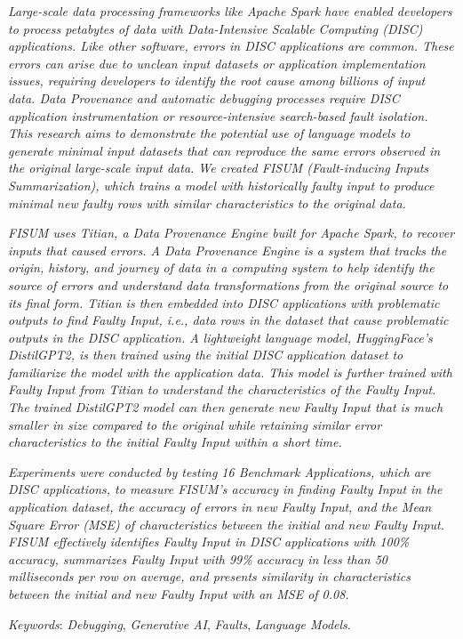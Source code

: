 \emph{Large-scale data processing frameworks like Apache Spark have enabled developers to process petabytes of data with Data-Intensive Scalable Computing (DISC) applications. Like other software, errors in DISC applications are common. These errors can arise due to unclean input datasets or application implementation issues, requiring developers to identify the root cause among billions of input data. Data Provenance and automatic debugging processes require DISC application instrumentation or resource-intensive search-based fault isolation. This research aims to demonstrate the potential use of language models to generate minimal input datasets that can reproduce the same errors observed in the original large-scale input data. We created FISUM (Fault-inducing Inputs Summarization), which trains a model with historically faulty input to produce minimal new faulty rows with similar characteristics to the original data.}

\emph{FISUM uses Titian, a Data Provenance Engine built for Apache Spark, to recover inputs that caused errors. A Data Provenance Engine is a system that tracks the origin, history, and journey of data in a computing system to help identify the source of errors and understand data transformations from the original source to its final form. Titian is then embedded into DISC applications with problematic outputs to find Faulty Input, i.e., data rows in the dataset that cause problematic outputs in the DISC application. A lightweight language model, HuggingFace's DistilGPT2, is then trained using the initial DISC application dataset to familiarize the model with the application data. This model is further trained with Faulty Input from Titian to understand the characteristics of the Faulty Input. The trained DistilGPT2 model can then generate new Faulty Input that is much smaller in size compared to the original while retaining similar error characteristics to the initial Faulty Input within a short time.}

\emph{Experiments were conducted by testing 16 Benchmark Applications, which are DISC applications, to measure FISUM's accuracy in finding Faulty Input in the application dataset, the accuracy of errors in new Faulty Input, and the Mean Square Error (MSE) of characteristics between the initial and new Faulty Input. FISUM effectively identifies Faulty Input in DISC applications with 100\% accuracy, summarizes Faulty Input with 99\% accuracy in less than 50 milliseconds per row on average, and presents similarity in characteristics between the initial and new Faulty Input with an MSE of 0.08.}


\emph{Keywords}: \emph{Debugging}, \emph{Generative AI}, \emph{Faults}, \emph{Language Models}.
